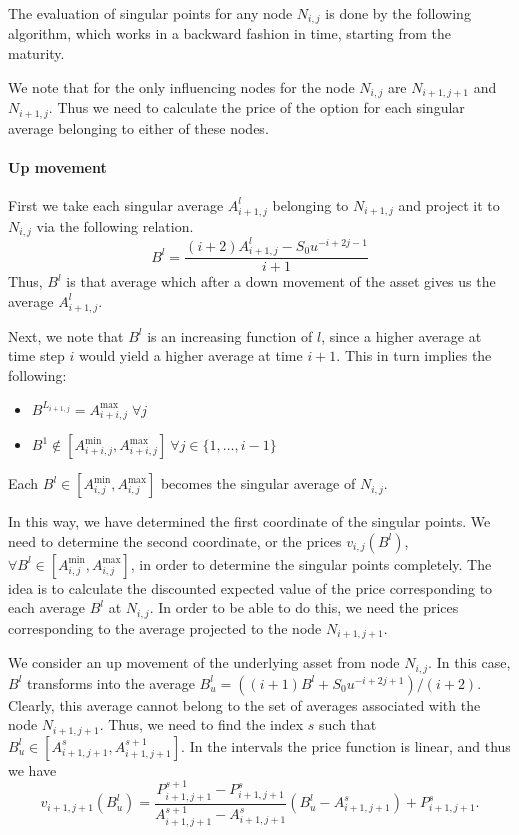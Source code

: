 The evaluation of singular points for any node $ N_{i,j} $ is done by the following algorithm, which works in a backward fashion in time, starting from the maturity.

We note that for the only influencing nodes for the node $ N_{i,j} $ are $ N_{i+1,j+1} $ and $ N_{i+1,j} $. Thus we need to calculate the price of the option for each singular average belonging to either of these nodes.


\paragraph{Up movement}

First we take each singular average $ A_{i+1,j}^l $ belonging to $ N_{i+1,j} $ and project it to $ N_{i,j} $ via the following relation.
\begin{equation}
	\label{eq:asian-proj-up}
	B^l = \frac{ ( i+2) A_{i+1,j}^l - S_0 u^{-i+2j-1} }{ i+1 }
\end{equation}
Thus, $ B^l $ is that average which after a down movement of the asset gives us the average $ A_{i+1,j}^l $.

Next, we note that $ B^l $ is an increasing function of $ l $, since a higher average at time step $ i $ would yield a higher average at time $ i+1 $. This in turn implies the following:
\begin{itemize}
\item $ B^{L_{i+1,j}} = A_{i+i,j}^{\max} \; \forall j $
\item $ B^1 \notin \left[ A_{i+i,j}^{\min}, A_{i+i,j}^{\max} \right] \ \forall j \in \{1, \dots, i-1 \} $
\end{itemize}
Each $ B^l \in \left[ A_{i,j}^{\min}, A_{i,j}^{\max} \right] $ becomes the singular average of $ N_{i,j} $.

In this way, we have determined the first coordinate of the singular points. We need to determine the second coordinate, or the prices $ v_{i,j}(B^l) $, $ \forall B^l \in \left[ A_{i,j}^{\min}, A_{i,j}^{\max} \right] $, in order to determine the singular points completely. The idea is to calculate the discounted expected value of the price corresponding to each average $ B^l $ at $ N_{i,j} $. In order to be able to do this, we need the prices corresponding to the average projected to the node $ N_{i+1,j+1} $.

We consider an up movement of the underlying asset from node $ N_{i,j} $. In this case, $ B^l $ transforms into the average $ B^l_u = \left( (i+1) B^l + S_0 u^{-i+2j+1} \right) / ( i+2 ) $. Clearly, this average cannot belong to the set of averages associated with the node $ N_{i+1,j+1} $. Thus, we need to find the index $s$ such that $ B^l_u \in \left[ A_{i+1,j+1}^{s} , A_{i+1,j+1}^{s+1} \right] $. In the intervals the price function is linear, and thus we have
\begin{equation}
	\label{eq:asian-up-lint}
	v_{i+1,j+1} \left( B^l_u \right) = \frac{ P_{i+1,j+1}^{s+1} - P_{i+1,j+1}^{s} }{ A_{i+1,j+1}^{s+1} - A_{i+1,j+1}^{s} } \left( B^l_u - A_{i+1,j+1}^{s} \right) + P_{i+1,j+1}^{s} .
\end{equation}

